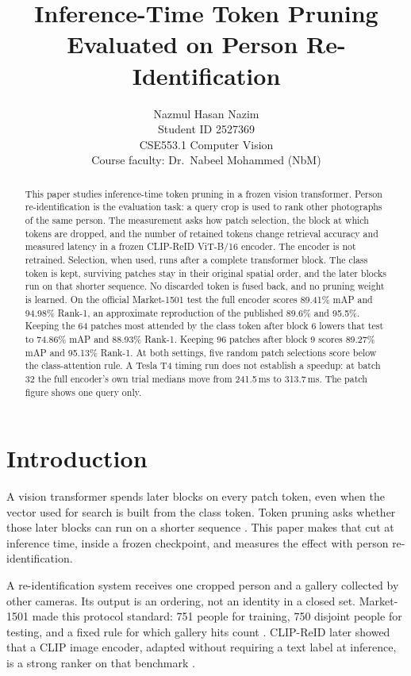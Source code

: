 \documentclass[11pt]{article}
\title{Inference-Time Token Pruning\\Evaluated on Person Re-Identification}
\author{Nazmul Hasan Nazim \\ Student ID 2527369 \\[0.5em]
CSE553.1 Computer Vision \\ Course faculty: Dr.\ Nabeel Mohammed (NbM)}
\date{}
\begin{document}
\maketitle

\begin{abstract}
This paper studies inference-time token pruning in a frozen vision transformer.
Person re-identification is the evaluation task: a query crop is used to rank other photographs of the same person.
The measurement asks how patch selection, the block at which tokens are dropped, and the number of retained tokens change retrieval accuracy and measured latency in a frozen CLIP-ReID ViT-B/16 encoder.
The encoder is not retrained.
Selection, when used, runs after a complete transformer block.
The class token is kept, surviving patches stay in their original spatial order, and the later blocks run on that shorter sequence.
No discarded token is fused back, and no pruning weight is learned.
On the official Market-1501 test the full encoder scores 89.41\% mAP and 94.98\% Rank-1, an approximate reproduction of the published 89.6\% and 95.5\%.
Keeping the 64 patches most attended by the class token after block 6 lowers that test to 74.86\% mAP and 88.93\% Rank-1.
Keeping 96 patches after block 9 scores 89.27\% mAP and 95.13\% Rank-1.
At both settings, five random patch selections score below the class-attention rule.
A Tesla T4 timing run does not establish a speedup: at batch 32 the full encoder's own trial medians move from 241.5\,ms to 313.7\,ms.
The patch figure shows one query only.
\end{abstract}

\section{Introduction}
A vision transformer spends later blocks on every patch token, even when the vector used for search is built from the class token.
Token pruning asks whether those later blocks can run on a shorter sequence \cite{liang2022evit}.
This paper makes that cut at inference time, inside a frozen checkpoint, and measures the effect with person re-identification.

A re-identification system receives one cropped person and a gallery collected by other cameras.
Its output is an ordering, not an identity in a closed set.
Market-1501 made this protocol standard: 751 people for training, 750 disjoint people for testing, and a fixed rule for which gallery hits count \cite{zheng2015market}.
CLIP-ReID later showed that a CLIP image encoder, adapted without requiring a text label at inference, is a strong ranker on that benchmark \cite{li2023clipreid,radford2021clip}.
\end{document}
